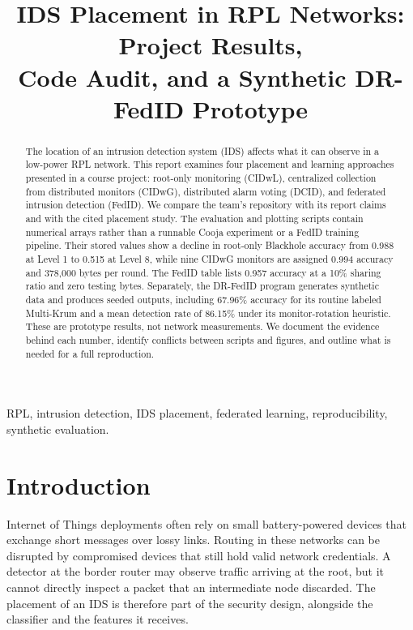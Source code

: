 \documentclass[conference]{IEEEtran}
\begin{document}
\title{IDS Placement in RPL Networks: Project Results,\\Code Audit, and a Synthetic DR-FedID Prototype}

\author{
}

\maketitle

\begin{abstract}
The location of an intrusion detection system (IDS) affects what it can observe in a low-power RPL network. This report examines four placement and learning approaches presented in a course project: root-only monitoring (CIDwL), centralized collection from distributed monitors (CIDwG), distributed alarm voting (DCID), and federated intrusion detection (FedID). We compare the team's repository with its report claims and with the cited placement study. The evaluation and plotting scripts contain numerical arrays rather than a runnable Cooja experiment or a FedID training pipeline. Their stored values show a decline in root-only Blackhole accuracy from 0.988 at Level 1 to 0.515 at Level 8, while nine CIDwG monitors are assigned 0.994 accuracy and 378,000 bytes per round. The FedID table lists 0.957 accuracy at a 10\% sharing ratio and zero testing bytes. Separately, the DR-FedID program generates synthetic data and produces seeded outputs, including 67.96\% accuracy for its routine labeled Multi-Krum and a mean detection rate of 86.15\% under its monitor-rotation heuristic. These are prototype results, not network measurements. We document the evidence behind each number, identify conflicts between scripts and figures, and outline what is needed for a full reproduction.
\end{abstract}

\begin{IEEEkeywords}
RPL, intrusion detection, IDS placement, federated learning, reproducibility, synthetic evaluation.
\end{IEEEkeywords}

\section{Introduction}
Internet of Things deployments often rely on small battery-powered devices that exchange short messages over lossy links. Routing in these networks can be disrupted by compromised devices that still hold valid network credentials. A detector at the border router may observe traffic arriving at the root, but it cannot directly inspect a packet that an intermediate node discarded. The placement of an IDS is therefore part of the security design, alongside the classifier and the features it receives.
\end{document}
